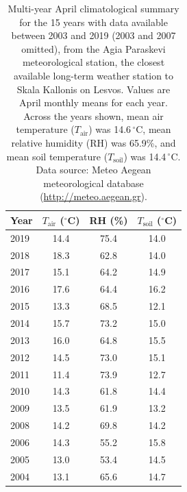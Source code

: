 \documentclass[11pt,a4paper]{article}
\begin{document}

\begin{table}[!htbp]
\centering
\begingroup
\fontsize{9}{11}\selectfont

\caption{Multi-year April climatological summary for the 15 years with data available between 2003 and 2019 (2003 and 2007 omitted), from the Agia Paraskevi meteorological station, the closest available long-term weather station to Skala Kallonis on Lesvos. Values are April monthly means for each year. Across the years shown, mean air temperature ($T_{\mathrm{air}}$) was 14.6\,$^\circ$C, mean relative humidity (RH) was 65.9\%, and mean soil temperature ($T_{\mathrm{soil}}$) was 14.4\,$^\circ$C. Data source: Meteo Aegean meteorological database (\url{http://meteo.aegean.gr}).}
\label{tab:multi_april_climate}

\setlength{\tabcolsep}{6pt}
\renewcommand{\arraystretch}{1.05}

\begin{tabular}{lccc}
\toprule
Year & $T_{\mathrm{air}}$ ($^\circ$C) & RH (\%) & $T_{\mathrm{soil}}$ ($^\circ$C) \\
\midrule
2019 & 14.4 & 75.4 & 14.0 \\
2018 & 18.3 & 62.8 & 14.0 \\
2017 & 15.1 & 64.2 & 14.9 \\
2016 & 17.6 & 64.4 & 16.2 \\
2015 & 13.3 & 68.5 & 12.1 \\
2014 & 15.7 & 73.2 & 15.0 \\
2013 & 16.0 & 64.8 & 15.5 \\
2012 & 14.5 & 73.0 & 15.1 \\
2011 & 11.4 & 73.9 & 12.7 \\
2010 & 14.3 & 61.8 & 14.4 \\
2009 & 13.5 & 61.9 & 13.2 \\
2008 & 14.2 & 69.8 & 14.2 \\
2006 & 14.3 & 55.2 & 15.8 \\
2005 & 13.0 & 53.4 & 14.5 \\
2004 & 13.1 & 65.6 & 14.7 \\
\bottomrule
\end{tabular}

\endgroup
\end{table}

\end{document}
